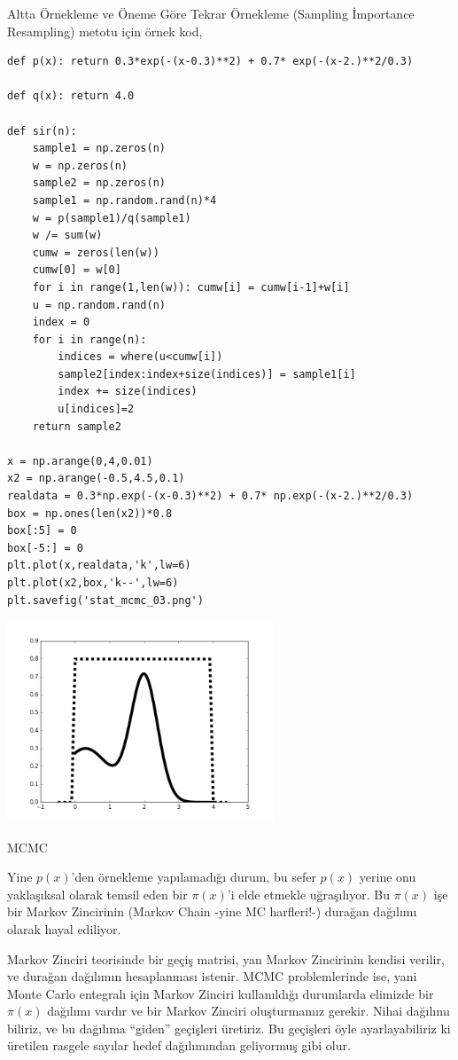 \documentclass[12pt,fleqn]{article}\usepackage{../../common}
\begin{document}
Altta Örnekleme ve Öneme Göre Tekrar Örnekleme (Sampling İmportance Resampling)
metotu için örnek kod,

\begin{verbatim}
def p(x): return 0.3*exp(-(x-0.3)**2) + 0.7* exp(-(x-2.)**2/0.3) 

def q(x): return 4.0

def sir(n):    
    sample1 = np.zeros(n)
    w = np.zeros(n)
    sample2 = np.zeros(n)    
    sample1 = np.random.rand(n)*4
    w = p(sample1)/q(sample1)
    w /= sum(w)
    cumw = zeros(len(w))
    cumw[0] = w[0]
    for i in range(1,len(w)): cumw[i] = cumw[i-1]+w[i]
    u = np.random.rand(n)
    index = 0
    for i in range(n):
        indices = where(u<cumw[i])
        sample2[index:index+size(indices)] = sample1[i]
        index += size(indices)
        u[indices]=2
    return sample2

x = np.arange(0,4,0.01)
x2 = np.arange(-0.5,4.5,0.1)
realdata = 0.3*np.exp(-(x-0.3)**2) + 0.7* np.exp(-(x-2.)**2/0.3) 
box = np.ones(len(x2))*0.8
box[:5] = 0
box[-5:] = 0
plt.plot(x,realdata,'k',lw=6)
plt.plot(x2,box,'k--',lw=6)
plt.savefig('stat_mcmc_03.png')
\end{verbatim}

\includegraphics[height=6cm]{stat_mcmc_03.png}

MCMC

Yine $p(x)$'den örnekleme yapılamadığı durum, bu sefer $p(x)$ yerine onu
yaklaşıksal olarak temsil eden bir $\pi(x)$'i elde etmekle uğraşılıyor. Bu
$\pi(x)$ işe bir Markov Zincirinin (Markov Chain -yine MC harfleri!-) durağan
dağılımı olarak hayal ediliyor.

Markov Zinciri teorisinde bir geçiş matrisi, yan Markov Zincirinin kendisi
verilir, ve durağan dağılımın hesaplanması istenir. MCMC problemlerinde
ise, yani Monte Carlo entegralı için Markov Zinciri kullanıldığı durumlarda
elimizde bir $\pi(x)$ dağılımı vardır ve bir Markov Zinciri oluşturmamız
gerekir. Nihai dağılımı biliriz, ve bu dağılıma ``giden'' geçişleri
üretiriz. Bu geçişleri öyle ayarlayabiliriz ki üretilen rasgele sayılar
hedef dağılımından geliyormuş gibi olur. 
\end{document}
